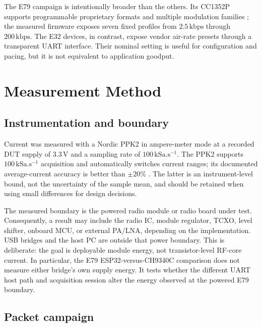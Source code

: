 \documentclass[10pt,a4paper]{article}
\newcommand{\SI}[2]{\ensuremath{#1\,\mathrm{#2}}}
\begin{document}
{\footnotesize\setlength{\tabcolsep}{2pt}

}

The E79 campaign is intentionally broader than the others. Its CC1352P supports programmable proprietary formats and multiple modulation families \cite{ti_cc1352p}; the measured firmware exposes seven fixed profiles from \SI{2.5}{kbps} through \SI{200}{kbps}. The E32 devices, in contrast, expose vendor air-rate presets through a transparent UART interface. Their nominal setting is useful for configuration and pacing, but it is not equivalent to application goodput.

\section{Measurement Method}

\subsection{Instrumentation and boundary}

Current was measured with a Nordic PPK2 in ampere-meter mode at a recorded DUT supply of \SI{3.3}{V} and a sampling rate of \SI{100}{kSa.s^{-1}}. The PPK2 supports \SI{100}{kSa.s^{-1}} acquisition and automatically switches current ranges; its documented average-current accuracy is better than $\pm 20\%$ \cite{nordic_ppk2}. The latter is an instrument-level bound, not the uncertainty of the sample mean, and should be retained when using small differences for design decisions.

The measured boundary is the powered radio module or radio board under test. Consequently, a result may include the radio IC, module regulator, TCXO, level shifter, onboard MCU, or external PA/LNA, depending on the implementation. USB bridges and the host PC are outside that power boundary. This is deliberate: the goal is deployable module energy, not transistor-level RF-core current. In particular, the E79 ESP32-versus-CH9340C comparison does not measure either bridge's own supply energy. It tests whether the different UART host path and acquisition session alter the energy observed at the powered E79 boundary.

\subsection{Packet campaign}
\end{document}
